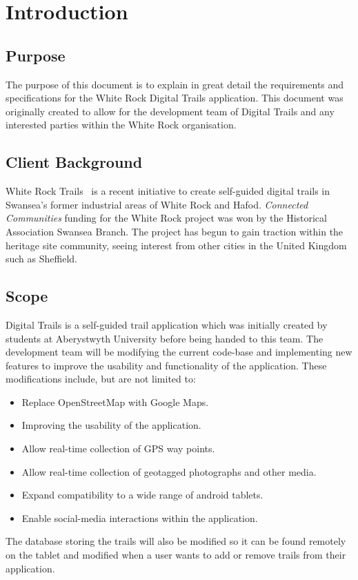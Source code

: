 \documentclass[11pt,a4paper]{article}
\begin{document}


\newpage 

\tableofcontents

\newpage
\section{Introduction}
\subsection{Purpose}
\label{sec:purpose}
The purpose of this document is to explain in great detail the requirements and specifications for the White Rock Digital Trails application. This document was originally created to allow for the development team of Digital Trails and any interested parties within the White Rock organisation.

\subsection{Client Background}
\label{sec:client-background}
White Rock Trails~\cite{whiterock} is a recent initiative to create self-guided digital trails in Swansea's former industrial areas of White Rock and Hafod. \emph{Connected Communities} funding for the White Rock project was won by the Historical Association Swansea Branch. The project has begun to gain traction within the heritage site community, seeing interest from other cities in the United Kingdom such as Sheffield.

\subsection{Scope}
\label{sec:scope}
Digital Trails is a self-guided trail application which was initially created by students at Aberystwyth University before being handed to this team. The development team will be modifying the current code-base and implementing new features to improve the usability and functionality of the application.
These modifications include, but are not limited to:
\begin{itemize}
\item Replace OpenStreetMap with Google Maps.
\item Improving the usability of the application.
\item Allow real-time collection of GPS way points.
\item Allow real-time collection of geotagged photographs and other media.
\item Expand compatibility to a wide range of android tablets.
\item Enable social-media interactions within the application.
\end{itemize}
The database storing the trails will also be modified so it can be found remotely on the tablet and modified when a user wants to add or remove trails from their application.
\end{document}
